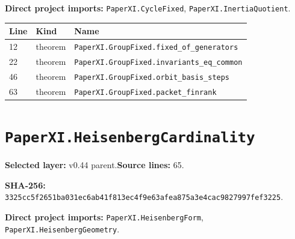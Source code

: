 \documentclass[10pt,oneside]{book}
\begin{document}
\textbf{Direct project imports:} \nolinkurl{PaperXI.CycleFixed}, \nolinkurl{PaperXI.InertiaQuotient}.

\begin{longtable}{@{}p{}p{}p{}@{}}\toprule Line&Kind&Name\\\midrule\endhead

12&theorem&\nolinkurl{PaperXI.GroupFixed.fixed_of_generators}\\

22&theorem&\nolinkurl{PaperXI.GroupFixed.invariants_eq_common}\\

46&theorem&\nolinkurl{PaperXI.GroupFixed.orbit_basis_steps}\\

63&theorem&\nolinkurl{PaperXI.GroupFixed.packet_finrank}\\

\bottomrule\end{longtable}

\section{\texorpdfstring{\nolinkurl{PaperXI.HeisenbergCardinality}}{PaperXI.HeisenbergCardinality}}\label{module:PaperXI.HeisenbergCardinality}

\textbf{Selected layer:} v0.44 parent.\quad\textbf{Source lines:} 65.\par\textbf{SHA-256:} {\scriptsize\nolinkurl{3325cc5f2651ba031ec6ab41f813ec4f9e63afea875a3e4cac9827997fef3225}}.


\textbf{Direct project imports:} \nolinkurl{PaperXI.HeisenbergForm}, \nolinkurl{PaperXI.HeisenbergGeometry}.
\end{document}
